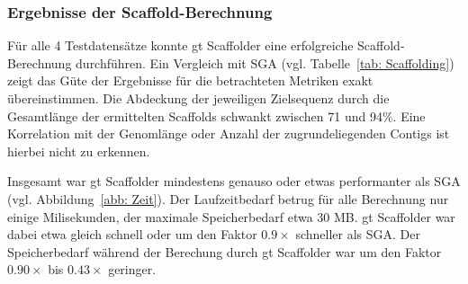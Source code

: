 \documentclass[a4paper,10pt,parskip]{scrartcl}
\begin{document}
\subsubsection*{Ergebnisse der Scaffold-Berechnung}

Für alle 4 Testdatensätze konnte gt Scaffolder eine erfolgreiche
Scaffold-Berechnung durchführen. Ein Vergleich mit SGA (vgl.
Tabelle~\ref{tab: Scaffolding}) zeigt das Güte der Ergebnisse für die
betrachteten Metriken exakt übereinstimmen. Die Abdeckung der
jeweiligen Zielsequenz durch die Gesamtlänge der ermittelten Scaffolds
schwankt zwischen 71 und 94\%. Eine Korrelation mit der Genomlänge
oder Anzahl der zugrundeliegenden  
Contigs ist hierbei nicht zu erkennen.

Insgesamt war gt Scaffolder mindestens genauso oder etwas performanter als
SGA (vgl. Abbildung~\ref{abb: Zeit}). Der Laufzeitbedarf betrug für alle
Berechnung nur einige Milisekunden, der maximale Speicherbedarf etwa 30 MB. gt
Scaffolder war dabei etwa gleich schnell oder um den Faktor $0.9\times$
schneller als SGA. Der Speicherbedarf während der Berechung durch gt
Scaffolder war um den Faktor $0.90\times$ bis $0.43\times$ geringer.
\end{document}
